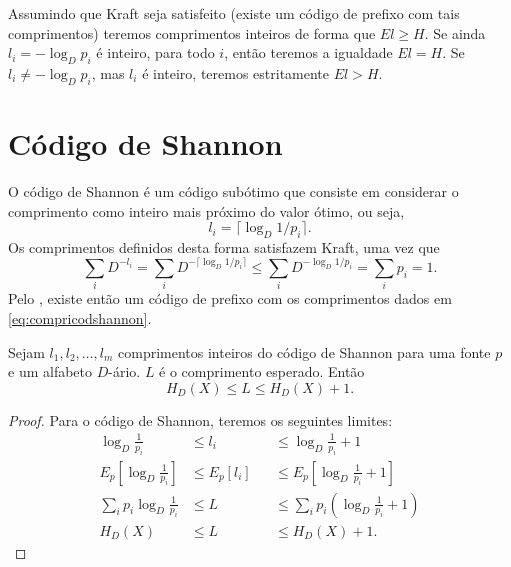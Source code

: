 Assumindo que Kraft seja satisfeito (existe um código de prefixo com tais comprimentos)
teremos comprimentos inteiros de forma que $E l \geq H$. Se ainda $l_i = -\log_D p_i$ é
inteiro, para todo $i$, então teremos a igualdade $E l = H$. 
Se $l_i \neq -\log_D p_i$, mas $l_i$ é inteiro, teremos estritamente $E l > H$.


\section{Código de Shannon}
O código de Shannon é um código subótimo que consiste em considerar
o comprimento como inteiro mais próximo do valor ótimo, ou seja,
\begin{equation}\label{eq:compricodshannon}
  l_i = \lceil \log_D 1/p_i \rceil .
\end{equation}
Os comprimentos definidos desta forma satisfazem Kraft, uma vez que
\begin{equation}
  \sum_i D^{-l_i} = \sum_i D ^{- \lceil \log_D 1/p_i \rceil} \leq \sum_i D^{-\log_D 1/p_i} = \sum_i p_i = 1 .
\end{equation} 
Pelo , existe então um código de prefixo com os comprimentos dados em \ref{eq:compricodshannon}.

\begin{theorem}
  Sejam $l_1, l_2, \ldots, l_m$ comprimentos inteiros do código de Shannon para uma fonte $p$ e um
  alfabeto $D$-ário. $L$ é o comprimento esperado. Então
  \begin{equation}
   H_D(X) \leq L \leq H_D(X) + 1 .
  \end{equation}
\end{theorem}
\begin{proof}
Para o código de Shannon, teremos os seguintes limites:
\begin{subequations}\label{eq:limitescodshannon}
      \begin{alignat}{2}
	  \log_D \frac{1}{p_i} & \leq l_i && \leq \log_D \frac{1}{p_i} + 1 \\
	  E_p \left[ \log_D \frac{1}{p_i} \right]  & \leq E_p \left[ l_i \right] && \leq E_p \left[ \log_D \frac{1}{p_i} + 1 \right] \\
	  \sum_i p_i \log_D \frac{1}{p_i} & \leq L && \leq \sum_i p_i \left( \log_D \frac{1}{p_i} + 1 \right) \\
	  H_D(X) & \leq L && \leq H_D(X) + 1 .
      \end{alignat}
\end{subequations}
\end{proof}

